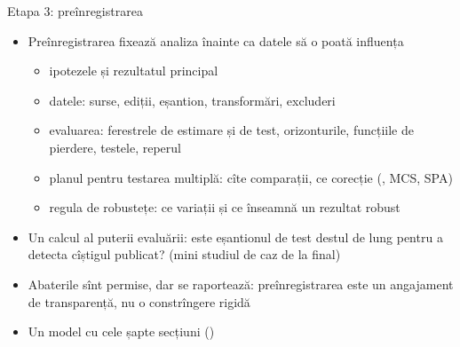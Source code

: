 \begin{frame}{Etapa 3: preînregistrarea}
\itemsize{\small}
\begin{itemize}
    \item Preînregistrarea fixează analiza înainte ca datele să o poată influența 
    \begin{itemize}
        \item ipotezele și rezultatul principal
        \item datele: surse, ediții, eșantion, transformări, excluderi
        \item evaluarea: ferestrele de estimare și de test, orizonturile, funcțiile de pierdere, testele, reperul
        \item planul pentru testarea multiplă: cîte comparații, ce corecție (, MCS, SPA)
        \item regula de robustețe: ce variații și ce înseamnă un rezultat robust
    \end{itemize}
    \item Un calcul al puterii evaluării: este eșantionul de test destul de lung pentru a detecta cîștigul publicat? (mini studiul de caz de la final)
    \item Abaterile sînt permise, dar se raportează: preînregistrarea este un angajament de transparență, nu o constrîngere rigidă
    \item Un model cu cele șapte secțiuni () %
\end{itemize}
\end{frame}


